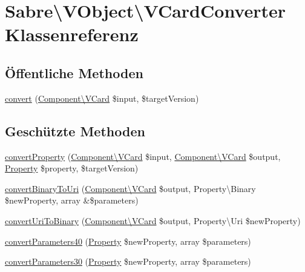 \hypertarget{class_sabre_1_1_v_object_1_1_v_card_converter}{}\section{Sabre\textbackslash{}V\+Object\textbackslash{}V\+Card\+Converter Klassenreferenz}
\label{class_sabre_1_1_v_object_1_1_v_card_converter}
\subsection*{Öffentliche Methoden}
\begin{DoxyCompactItemize}
\item 
\mbox{\hyperlink{class_sabre_1_1_v_object_1_1_v_card_converter_ad46934ad06f5d8074c05191c42201325}{convert}} (\mbox{\hyperlink{class_sabre_1_1_v_object_1_1_component_1_1_v_card}{Component\textbackslash{}\+V\+Card}} \$input, \$target\+Version)
\end{DoxyCompactItemize}
\subsection*{Geschützte Methoden}
\begin{DoxyCompactItemize}
\item 
\mbox{\hyperlink{class_sabre_1_1_v_object_1_1_v_card_converter_a7d6b1368508f5e3e30eb05721b9b366d}{convert\+Property}} (\mbox{\hyperlink{class_sabre_1_1_v_object_1_1_component_1_1_v_card}{Component\textbackslash{}\+V\+Card}} \$input, \mbox{\hyperlink{class_sabre_1_1_v_object_1_1_component_1_1_v_card}{Component\textbackslash{}\+V\+Card}} \$output, \mbox{\hyperlink{class_sabre_1_1_v_object_1_1_property}{Property}} \$property, \$target\+Version)
\item 
\mbox{\hyperlink{class_sabre_1_1_v_object_1_1_v_card_converter_a7d56560652cab8f3df3d0fac1d413d1f}{convert\+Binary\+To\+Uri}} (\mbox{\hyperlink{class_sabre_1_1_v_object_1_1_component_1_1_v_card}{Component\textbackslash{}\+V\+Card}} \$output, Property\textbackslash{}\+Binary \$new\+Property, array \&\$parameters)
\item 
\mbox{\hyperlink{class_sabre_1_1_v_object_1_1_v_card_converter_a1e187d99bbed002fdee9632a37d51853}{convert\+Uri\+To\+Binary}} (\mbox{\hyperlink{class_sabre_1_1_v_object_1_1_component_1_1_v_card}{Component\textbackslash{}\+V\+Card}} \$output, Property\textbackslash{}\+Uri \$new\+Property)
\item 
\mbox{\hyperlink{class_sabre_1_1_v_object_1_1_v_card_converter_a655867f4c28120c9698ea29ecd3ae97e}{convert\+Parameters40}} (\mbox{\hyperlink{class_sabre_1_1_v_object_1_1_property}{Property}} \$new\+Property, array \$parameters)
\item 
\mbox{\hyperlink{class_sabre_1_1_v_object_1_1_v_card_converter_aae351e4520f11c14642b5ac113de290c}{convert\+Parameters30}} (\mbox{\hyperlink{class_sabre_1_1_v_object_1_1_property}{Property}} \$new\+Property, array \$parameters)
\end{DoxyCompactItemize}


